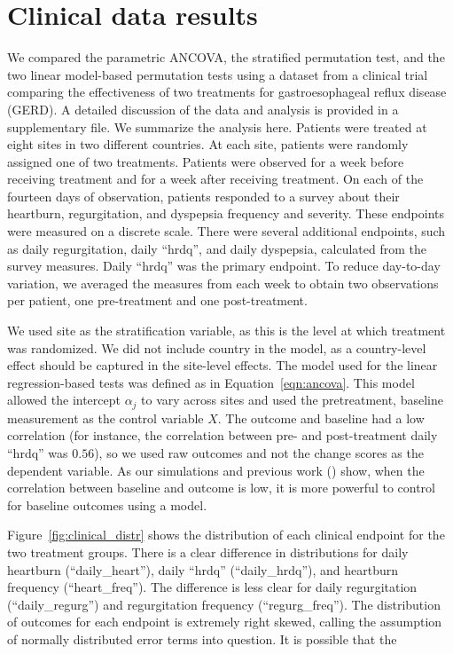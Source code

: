 \documentclass[12pt]{article}
\begin{document}
\section{Clinical data results}\label{sec:results}
We compared the parametric ANCOVA, the stratified permutation test, and the two linear model-based permutation tests using a dataset from a clinical trial comparing the effectiveness of two treatments for gastroesophageal reflux disease (GERD).
A detailed discussion of the data and analysis is provided in a supplementary file.
We summarize the analysis here.
Patients were treated at eight sites in two different countries.
At each site, patients were randomly assigned one of two treatments.
Patients were observed for a week before receiving treatment and for a week after receiving treatment.
On each of the fourteen days of observation, patients responded to a survey about their heartburn, regurgitation, and dyspepsia frequency and severity.
These endpoints were measured on a discrete scale.
There were several additional endpoints, such as daily regurgitation, daily ``hrdq'', and daily dyspepsia, calculated from the survey measures.
Daily ``hrdq'' was the primary endpoint.
To reduce day-to-day variation, we averaged the measures from each week to obtain two observations per patient, one pre-treatment and one post-treatment.

We used site as the stratification variable, as this is the level at which treatment was randomized.
We did not include country in the model, as a country-level effect should be captured in the site-level effects.
The model used for the linear regression-based tests was defined as in Equation~\ref{eqn:ancova}.
This model allowed the intercept $\alpha_j$ to vary across sites and used the pretreatment, baseline measurement as the control variable $X$.
The outcome and baseline had a low correlation (for instance, the correlation between pre- and post-treatment daily ``hrdq'' was $0.56$), so we used raw outcomes and not the change scores as the dependent variable. 
As our simulations and previous work (\cite{frison_repeated_1992}) show, when the correlation between baseline and outcome is low, it is more powerful to control for baseline outcomes using a model.

Figure~\ref{fig:clinical_distr} shows the distribution of each clinical endpoint for the two treatment groups.
There is a clear difference in distributions for daily heartburn (``daily\_heart''), daily ``hrdq'' (``daily\_hrdq''), and heartburn frequency (``heart\_freq'').
The difference is less clear for daily regurgitation (``daily\_regurg'') and regurgitation frequency (``regurg\_freq'').
The distribution of outcomes for each endpoint is extremely right skewed, calling the assumption of normally distributed error terms into question.
It is possible that the 
\end{document}

